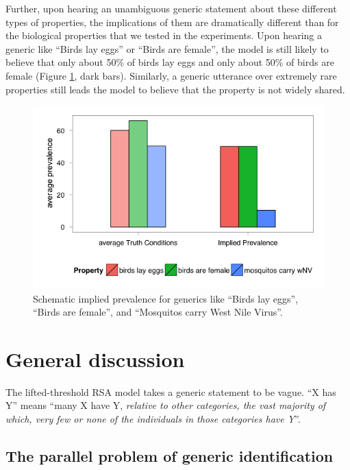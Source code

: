 \documentclass[10pt,letterpaper]{article}
\begin{document}
Further, upon hearing an unambiguous generic statement about these different types of properties, the implications of them are dramatically different than for the biological properties that we tested in the experiments. Upon hearing a generic like ``Birds lay eggs'' or ``Birds are female'', the model is still likely to believe that only about 50\% of birds lay eggs and only about 50\% of birds are female (Figure \ref{fig:schem_ip}, dark bars). Similarly, a generic utterance over extremely rare properties still leads the model to believe that the property is not widely shared. 


\begin{figure}
  \begin{center}
    \includegraphics[width=0.8\columnwidth]{schematic_asym}
  \end{center}
  \caption{Schematic implied prevalence for generics like ``Birds lay eggs'', ``Birds are female'', and ``Mosquitos carry West Nile Virus''.}
   \label{fig:schem_ip}
\end{figure}



%
%


\section{General discussion}

The lifted-threshold RSA model takes a generic statement to be vague. ``X has Y'' means ``many X have Y, \emph{relative to other categories, the vast majority of which, very few or none of the individuals in those categories have Y}''.

\subsection{The parallel problem of generic identification}
\end{document}
